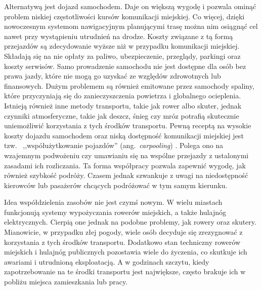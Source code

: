 Alternatywą jest dojazd samochodem. Daje on większą wygodę i pozwala ominąć problem niskiej częstotliwości kursów komunikacji miejskiej. 
Co więcej, dzięki nowoczesnym systemom nawigacyjnym planującymi trasę można nim osiągnąć cel nawet przy wystąpieniu utrudnień na drodze. 
Koszty związane z tą formą przejazdów są zdecydowanie wyższe niż w przypadku komunikacji miejskiej. 
Składają się na nie opłaty za paliwo, ubezpieczenie, przeglądy, parkingi oraz koszty serwisów. 
Samo prowadzenie samochodu nie jest dostępne dla osób bez prawa jazdy, które nie mogą go uzyskać ze względów zdrowotnych lub finansowych. 
Dużym problemem są również emitowane przez samochody spaliny, które przyczyniają się do zanieczyszczenia powietrza i globalnego ocieplenia.
Istnieją również inne metody transportu, takie jak rower albo skuter, jednak czynniki atmosferyczne, 
takie jak deszcz, śnieg czy mróz potrafią skutecznie uniemożliwić korzystania z tych środków transportu.
Pewną receptą na wysokie koszty dojazdu samochodem oraz niską dostępność komunikacji miejskiej jest tzw.\ 
,,współużytkowanie pojazdów'' (ang.~\emph{carpooling}) \cite{CARPOOL_ALL}. 
Polega ono na wzajemnym podwożeniu czy umawianiu się na wspólne 
przejazdy z ustalonymi zasadami ich rozliczania. Ta forma współpracy pozwala zapewnić wygodę, jak również szybkość podróży.
Czasem jednak szwankuje z uwagi na niedostępność kierowców lub pasażerów chcących podróżować w tym samym kierunku.

Idea współdzielenia zasobów nie jest czymś nowym. W wielu miastach funkcjonują systemy wypożyczania rowerów miejskich, a także hulajnóg elektrycznych.
Cierpią one jednak na podobne problemy, jak rowery oraz skutery. 
Mianowicie, w przypadku złej pogody, wiele osób decyduje się zrezygnować z korzystania z tych środków transportu.
Dodatkowo stan techniczny rowerów miejskich i hulajnóg publicznych pozostawia wiele do życzenia, co skutkuje ich awariami i utrudnioną eksploatacją. 
A w godzinach szczytu, kiedy zapotrzebowanie na te środki transportu jest największe, często brakuje ich w pobliżu miejsca zamieszkania lub pracy.

